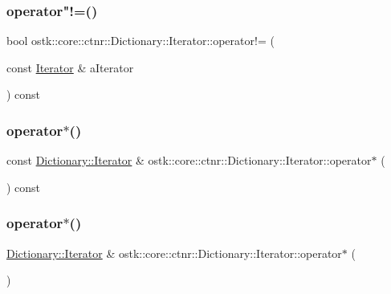 \subsubsection{\texorpdfstring{operator"!=()}{operator!=()}}
{\footnotesize\ttfamily bool ostk\+::core\+::ctnr\+::\+Dictionary\+::\+Iterator\+::operator!= (\begin{DoxyParamCaption}\item[{const \hyperlink{classostk_1_1core_1_1ctnr_1_1_dictionary_1_1_iterator}{Iterator} \&}]{a\+Iterator }\end{DoxyParamCaption}) const}

\mbox{\label{classostk_1_1core_1_1ctnr_1_1_dictionary_1_1_iterator_a4dbb071ffe9ecb5ec238f54fe8ef25c2}} 
\subsubsection{\texorpdfstring{operator$\ast$()}{operator*()}\hspace{0.1cm}{\footnotesize\ttfamily [1/2]}}
{\footnotesize\ttfamily const \hyperlink{classostk_1_1core_1_1ctnr_1_1_dictionary_1_1_iterator}{Dictionary\+::\+Iterator} \& ostk\+::core\+::ctnr\+::\+Dictionary\+::\+Iterator\+::operator$\ast$ (\begin{DoxyParamCaption}{ }\end{DoxyParamCaption}) const}

\mbox{\label{classostk_1_1core_1_1ctnr_1_1_dictionary_1_1_iterator_a170f805b2ecf85c1e30cfbe7af43d95f}} 
\subsubsection{\texorpdfstring{operator$\ast$()}{operator*()}\hspace{0.1cm}{\footnotesize\ttfamily [2/2]}}
{\footnotesize\ttfamily \hyperlink{classostk_1_1core_1_1ctnr_1_1_dictionary_1_1_iterator}{Dictionary\+::\+Iterator} \& ostk\+::core\+::ctnr\+::\+Dictionary\+::\+Iterator\+::operator$\ast$ (\begin{DoxyParamCaption}{ }\end{DoxyParamCaption})}

